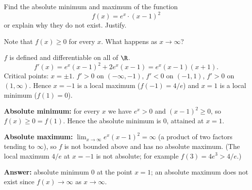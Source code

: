 
\begin{question}
Find the absolute minimum and maximum of the function
\[ f(x) = e^x \cdot (x-1)^2 \]
or explain why they do not exist. Justify.
\end{question}

\begin{hint}
Note that $f(x) \ge 0$ for every $x$. What happens as $x \to \infty$?
\end{hint}

\begin{solution}
$f$ is defined and differentiable on all of $\R$.
\[ f'(x) = e^x(x-1)^2 + 2e^x(x-1) = e^x(x-1)(x+1). \]
Critical points: $x = \pm 1$. $f' > 0$ on $(-\infty,-1)$, $f'<0$ on $(-1,1)$, $f'>0$ on $(1,\infty)$.
Hence $x=-1$ is a local maximum ($f(-1) = 4/e$) and $x=1$ is a local minimum ($f(1)=0$).

\textbf{Absolute minimum:} for every $x$ we have $e^x>0$ and $(x-1)^2 \ge 0$, so $f(x) \ge 0 = f(1)$. Hence the absolute minimum is $0$, attained at $x=1$.

\textbf{Absolute maximum:} $\lim_{x\to\infty} e^x(x-1)^2 = \infty$ (a product of two factors tending to $\infty$), so $f$ is not bounded above and has no absolute maximum.
(The local maximum $4/e$ at $x=-1$ is not absolute; for example $f(3) = 4e^3 > 4/e$.)

\textbf{Answer:} absolute minimum $0$ at the point $x=1$; an absolute maximum does not exist since $f(x)\to\infty$ as $x\to\infty$.
\end{solution}

